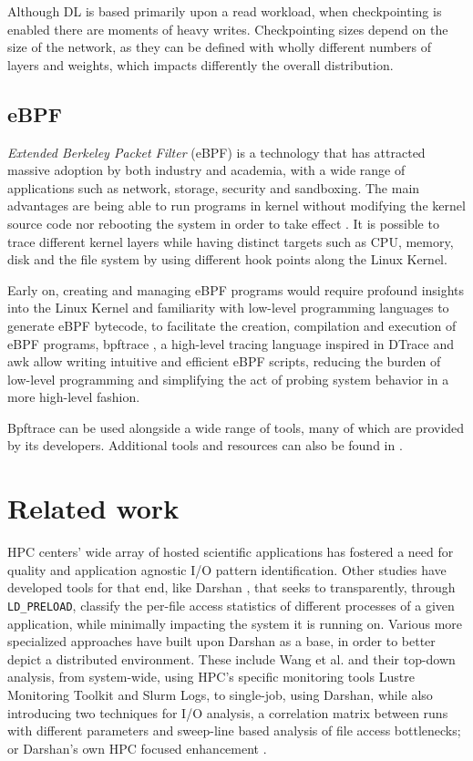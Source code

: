 \documentclass[conference]{IEEEtran}
\begin{document}
Although DL is based primarily upon a read workload, when checkpointing is enabled there are moments of heavy writes. Checkpointing sizes depend on the size of the network, as they can be defined with wholly different numbers of layers and weights, which impacts differently the overall distribution.

\subsection{eBPF}

\textit{Extended Berkeley Packet Filter} (eBPF) is a technology that has attracted massive adoption by both industry and academia, with a wide range of applications such as network, storage, security and sandboxing.
The main advantages are being able to run programs in kernel without modifying the kernel source code nor rebooting the system in order to take effect \cite{eBPFSurvey}.
It is possible to trace different kernel layers while having distinct targets such as CPU, memory, disk and the file system by using different hook points along the Linux Kernel.

Early on, creating and managing eBPF programs would require profound insights into the Linux Kernel and familiarity with low-level programming languages to generate eBPF bytecode,
to facilitate the creation, compilation and execution of eBPF programs, bpftrace \cite{bpftrace}, a high-level tracing language inspired in DTrace and awk allow writing intuitive and efficient eBPF scripts,
reducing the burden of low-level programming and simplifying the act of probing system behavior in a more high-level fashion. \cite{eBPFSurvey2} 

Bpftrace can be used alongside a wide range of tools, many of which are provided by its developers. Additional tools and resources can also be found in \cite{bgreggBook}.

\section{Related work}


HPC centers' wide array of hosted scientific applications has fostered a need for quality and application agnostic I/O pattern identification. Other studies have developed tools for that end, like Darshan \cite{HPCIO24/7}, that seeks to transparently, through \texttt{LD\_PRELOAD}, classify the per-file access statistics of different processes of a given application, while minimally impacting the system it is running on. Various more specialized approaches have built upon Darshan as a base, in order to better depict a distributed environment. These include Wang et al. \cite{zoomin} and their top-down analysis, from system-wide, using HPC's specific monitoring tools Lustre Monitoring Toolkit and Slurm Logs, to single-job, using Darshan, while also introducing two techniques for I/O analysis, a correlation matrix between runs with different parameters and sweep-line based analysis of file access bottlenecks; or Darshan's own HPC focused enhancement \cite{HPCIODarshan}.
\end{document}
